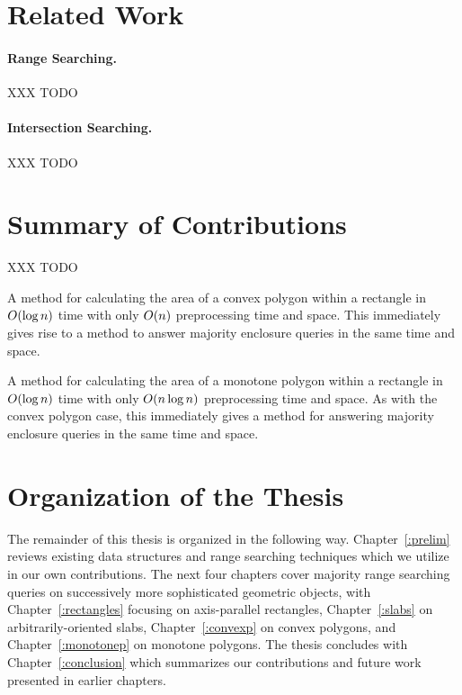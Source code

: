 \section{Related Work}
\label{:intro:related}

\paragraph{Range Searching.} 
XXX TODO

\paragraph{Intersection Searching.} 
XXX TODO


\section{Summary of Contributions}
\label{:intro:contributions}

XXX TODO

A method for calculating the area of a convex polygon within a rectangle in $O\!\left(\log{n}\right)$ time with only
$O\!\left(n\right)$ preprocessing time and space. This immediately gives rise to a method to answer majority enclosure queries in the same time and space.

A method for calculating the area of a monotone polygon within a rectangle in $O\!\left(\log{n}\right)$ time with only
$O\!\left(n \log{n}\right)$ preprocessing time and space. As with the convex polygon case, this immediately gives a method for answering majority enclosure queries in the same time and space.


\section{Organization of the Thesis}
\label{:intro:organization}

The remainder of this thesis is organized in the following way. 
Chapter~\ref{:prelim} reviews existing data structures and range searching techniques which we utilize in our own contributions.
The next four chapters cover majority range searching queries on successively more sophisticated geometric objects, with Chapter~\ref{:rectangles} focusing on axis-parallel rectangles, Chapter~\ref{:slabs} on arbitrarily-oriented slabs, Chapter~\ref{:convexp} on convex polygons, and Chapter~\ref{:monotonep} on monotone polygons.
The thesis concludes with Chapter~\ref{:conclusion} which summarizes our contributions and future work presented in earlier chapters.
